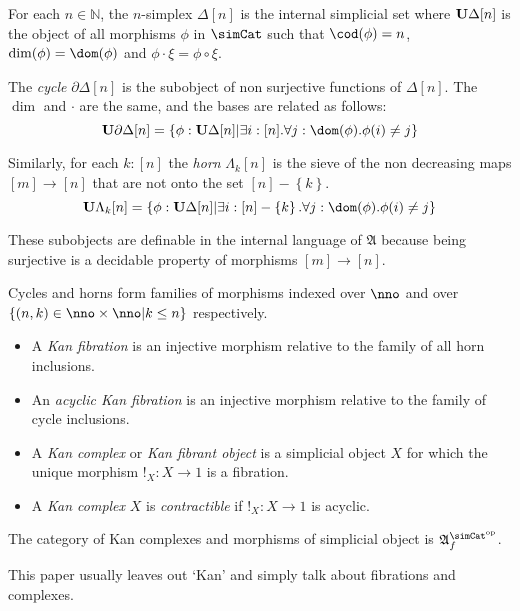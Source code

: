 \documentclass{tac}
\newcommand\hide[1]{}
\newcommand\set[1]{\left\{#1\right\}}
\newcommand\N{\mathbb N}
\newcommand\dual{^{\mathrm{op}}}
\newcommand\s{^{\simCat\dual}}
\newcommand\bang{!}
\newcommand\of{:}
\newcommand\simplex\Delta
\newcommand\cycle{\partial\Delta}
\newcommand\horn\Lambda
\newcommand\f{_f}
\newcommand\ambient{\mathfrak A}
\begin{document}
\hide{ Add def. of sieve over $\simCat$
Wrong: I was calling it a sieve because I was thinking of the category of elements of $\simplex[n]$
$\ambient\s$ defined?
Member functions for internal simplicial objects?
 }
\begin{definition} For each $n\in\N$, the $n$-simplex $\simplex[n]$ is the internal simplicial set where $\base{\simplex[n]}$ is the object of all morphisms $\phi$ in $\simCat$ such that $\cod(\phi) = n$, $\dim(\phi) = \dom(\phi)$ and $\phi\cdot \xi = \phi\circ \xi$.

The \emph{cycle} $\cycle[n]$ is the subobject of non surjective functions of $\simplex[n]$. The $\dim$ and $\cdot$ are the same, and the bases are related as follows:
\[ \base{\cycle[n]} = \set{\phi\of\base{\simplex[n]}| \exists i\of[n].\forall j\of \dom(\phi).\phi(i)\neq j } \]

Similarly, for each $k\of[n]$ the \emph{horn} $\horn_k[n]$ is the sieve of the non decreasing maps $[m]\to [n]$ that are not onto the set $[n]-\set{k}$.
\[ \base{\horn_k[n]} = \set{\phi\of\base{\simplex[n]}| \exists i\of[n]-\set k.\forall j\of \dom(\phi).\phi(i)\neq j } \]

\end{definition}

These subobjects are definable in the internal language of $\ambient$ because being surjective is a decidable property of morphisms $[m]\to[n]$.

\begin{definition} Cycles and horns form families of morphisms indexed over $\nno$ and over $\set{(n,k)\in\nno\times\nno| k\leq n }$ respectively.
\begin{itemize}
\item A \emph{Kan fibration} is an injective morphism relative to the family of all horn inclusions.
\item An \emph{acyclic Kan fibration} is an injective morphism relative to the family of cycle inclusions.
\item A \emph{Kan complex} or \emph{Kan fibrant object} is a simplicial object $X$ for which the unique morphism $\bang_X\of X\to 1$ is a fibration.
\item A \emph{Kan complex} $X$ is \emph{contractible} if $\bang_X\of X\to 1$ is acyclic.
\end{itemize}\label{Kan}

The category of Kan complexes and morphisms of simplicial object is $\ambient\s\f$. \hide{
In the categories we are looking at, the terminal object is projective. Therefore the internal and external concepts of having a filler operator coincide.
[I am so angry]
}
\end{definition}
This paper usually leaves out `Kan' and simply talk about fibrations and complexes.
\end{document}
